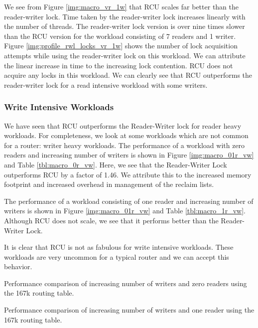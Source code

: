 \documentclass[a4paper]{article}
\begin{document}
We see from Figure \ref{img:macro_vr_1w} that RCU scales far better
than the reader-writer lock. Time taken by the reader-writer lock
increases linearly with the number of threads. The reader-writer lock
version is over nine times slower than the RCU version for the
workload consisting of 7 readers and 1 writer. Figure \ref{img:profile_rwl_locks_vr_1w} shows the number of lock acquisition attempts while using the reader-writer lock on this workload. We can attribute the linear increase in time to the increasing lock contention. RCU does not acquire any locks in this workload. We can clearly see that RCU
outperforms the reader-writer lock for a read intensive workload with some writers.

\subsubsection{Write Intensive Workloads}
We have seen that RCU outperforms the Reader-Writer lock for reader heavy workloads. For completeness, we look at some workloads which are not common for a router: writer heavy workloads. The performance of a workload with zero readers and increasing number of writers is shown in  Figure \ref{img:macro_01r_vw} and Table \ref{tbl:macro_0r_vw}. Here, we see that the Reader-Writer Lock outperforms RCU by a factor of 1.46. We attribute this to the increased memory footprint and increased overhead in management of the reclaim lists.

The performance of a workload consisting of one reader and increasing number of writers is shown in  Figure \ref{img:macro_01r_vw} and Table \ref{tbl:macro_1r_vw}. Although RCU does not scale, we see that it performs better than the Reader-Writer Lock.

It is clear that RCU is not as fabulous for write intensive workloads. These workloads are very uncommon for a typical router and we can accept this behavior.
 
\begin{table}[tph]
\begin{center}

\end{center}
\caption{Performance comparison of increasing number of writers and zero readers using the 167k routing table.}
\label{tbl:macro_0r_vw}
\end{table}

\begin{table}[tph]
\begin{center}

\end{center}
\caption{Performance comparison of increasing number of writers and one reader using the 167k routing table.}
\label{tbl:macro_1r_vw}
\end{table}
\end{document}
